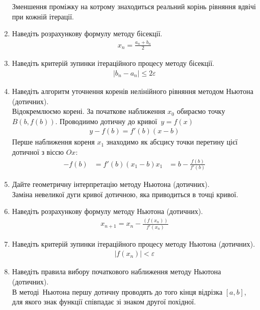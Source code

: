 \begin{enumerate}
          Зменшення проміжку на котрому знаходиться реальний корінь
          рівняння вдвічі при кожній ітерації.
    \item Наведіть розрахункову формулу методу бісекції.
          \begin{align}
              x_n = \frac{a_n + b_n}{2}
          \end{align}
    \item Наведіть критерій зупинки ітераційного процесу методу бісекції.
          \begin{align}
              |b_n - a_n| \leq 2 \varepsilon
          \end{align}
    \item Наведіть алгоритм уточнення коренів нелінійного рівняння методом Ньютона (дотичних). \\
          Відокремлюємо корені. За початкове наближення $x_0$ обираємо точку
          $B(b, f(b))$. Проводиимо дотичну до кривої $y = f(x)$
          \begin{align}
              y - f(b)= f'(b)(x - b)
          \end{align}
          Перше наближення кореня $x_1$ знаходимо як абсцису точки перетину
          цієї дотичної з віссю $Ox$:
          \begin{align}
              -f(b) & = f'(b)(x_1 - b)
              x_1   & = b - \frac{f(b)}{f'(b)}
          \end{align}
    \item Дайте геометричну інтерпретацію методу Ньютона (дотичних). \\
          Заміна невеликої дуги кривої дотичною, яка приводиться в точці кривої.
    \item Наведіть розрахункову формулу методу Ньютона (дотичних).
          \begin{align}
              x_{n + 1} = x_n - \frac{(f(x_n))}{f'(x_n)}
          \end{align}
    \item Наведіть критерій зупинки ітераційного процесу методу Ньютона (дотичних).
          \begin{align}
              |f(x_n)| < \varepsilon
          \end{align}
    \item Наведіть правила вибору початкового наближення методу Ньютона (дотичних). \\
          В методі Ньютона першу дотичну проводять до того кінця відрізка $[a, b]$,
          для якого знак функції співпадає зі знаком другої похідної.
\end{enumerate}
